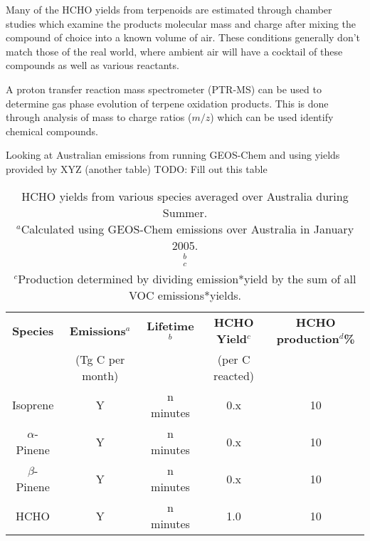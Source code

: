     Many of the HCHO yields from terpenoids are estimated through chamber studies which examine the products molecular mass and charge after mixing the compound of choice into a known volume of air.
    These conditions generally don't match those of the real world, where ambient air will have a cocktail of these compounds as well as various reactants.
    
    A proton transfer reaction mass spectrometer (PTR-MS) can be used to determine gas phase evolution of terpene oxidation products.
    This is done through analysis of mass to charge ratios ($m/z$) which can be used identify chemical compounds.
    
    Looking at Australian emissions from running GEOS-Chem and using yields provided by XYZ (another table)
    TODO: Fill out this table
    \begin{table}
    \begin{tabular}{ | c  c  c  c  c | }
      \hline
      \textbf{Species} & \textbf{Emissions$^a$} & \textbf{Lifetime$^b$} & \textbf{HCHO Yield$^c$} & \textbf{HCHO production$^d$\%}
      \\               & (Tg C per month)       &                       & (per C reacted)         &         \\ \hline
      Isoprene           & Y                     & n minutes            & 0.x                & 10       \\
      $\alpha$-Pinene    & Y                     & n minutes            & 0.x                & 10        \\ %
      $\beta$-Pinene     & Y                     & n minutes            & 0.x                & 10        \\
      HCHO               & Y                     & n minutes            & 1.0                & 10         \\ \hline
    \end{tabular}
    \caption{HCHO yields from various species averaged over Australia during Summer. \hspace{\textwidth} \\ 
    ${}^a$Calculated using GEOS-Chem emissions over Australia in January 2005. \hspace{\textwidth} \\ 
    ${}^b$ \hspace{\textwidth} \\ 
    ${}^c$ \hspace{\textwidth} \\ 
    ${}^c$Production determined by dividing emission*yield by the sum of all VOC emissions*yields. \hspace{\textwidth} \\ 
    }
    \label{ch_isop:tab:VOCAusYields}
    \end{table}
    
